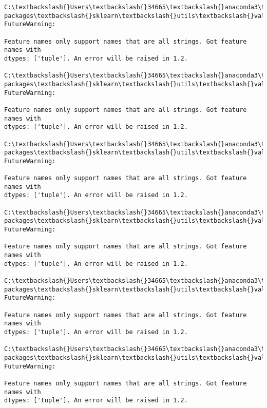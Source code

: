 \documentclass[11pt]{article}
\begin{document}
    \begin{Verbatim}[commandchars=\\\{\}]
C:\textbackslash{}Users\textbackslash{}34665\textbackslash{}anaconda3\textbackslash{}lib\textbackslash{}site-packages\textbackslash{}sklearn\textbackslash{}utils\textbackslash{}validation.py:1688:
FutureWarning:

Feature names only support names that are all strings. Got feature names with
dtypes: ['tuple']. An error will be raised in 1.2.

C:\textbackslash{}Users\textbackslash{}34665\textbackslash{}anaconda3\textbackslash{}lib\textbackslash{}site-packages\textbackslash{}sklearn\textbackslash{}utils\textbackslash{}validation.py:1688:
FutureWarning:

Feature names only support names that are all strings. Got feature names with
dtypes: ['tuple']. An error will be raised in 1.2.

C:\textbackslash{}Users\textbackslash{}34665\textbackslash{}anaconda3\textbackslash{}lib\textbackslash{}site-packages\textbackslash{}sklearn\textbackslash{}utils\textbackslash{}validation.py:1688:
FutureWarning:

Feature names only support names that are all strings. Got feature names with
dtypes: ['tuple']. An error will be raised in 1.2.

C:\textbackslash{}Users\textbackslash{}34665\textbackslash{}anaconda3\textbackslash{}lib\textbackslash{}site-packages\textbackslash{}sklearn\textbackslash{}utils\textbackslash{}validation.py:1688:
FutureWarning:

Feature names only support names that are all strings. Got feature names with
dtypes: ['tuple']. An error will be raised in 1.2.

C:\textbackslash{}Users\textbackslash{}34665\textbackslash{}anaconda3\textbackslash{}lib\textbackslash{}site-packages\textbackslash{}sklearn\textbackslash{}utils\textbackslash{}validation.py:1688:
FutureWarning:

Feature names only support names that are all strings. Got feature names with
dtypes: ['tuple']. An error will be raised in 1.2.

C:\textbackslash{}Users\textbackslash{}34665\textbackslash{}anaconda3\textbackslash{}lib\textbackslash{}site-packages\textbackslash{}sklearn\textbackslash{}utils\textbackslash{}validation.py:1688:
FutureWarning:

Feature names only support names that are all strings. Got feature names with
dtypes: ['tuple']. An error will be raised in 1.2.


\end{Verbatim}
\end{document}
